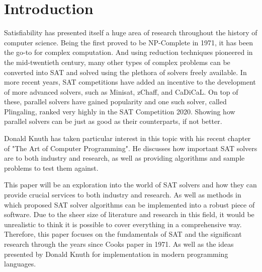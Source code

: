 \documentclass{article}
\begin{document}


\newpage
\thispagestyle{empty}
\tableofcontents

\newpage
\section{Introduction}
Satisfiability has presented itself a huge area of research throughout the history of computer
science. Being the first proved to be NP-Complete in 1971\cite{scook}, it has been the go-to for complex
computation. And using reduction techniques pioneered in the mid-twentieth century, many other types
of complex problems can be converted into SAT and solved using the plethora of solvers freely
available. In more recent years, SAT competitions have added an incentive to the development of more
advanced solvers, such as Minisat, zChaff, and CaDiCaL. On top of these, parallel solvers have
gained popularity and one such solver, called Plingaling, ranked very highly in the SAT Competition
2020. Showing how parallel solvers can be just as good as their counterparts, if not better.

Donald Knuth has taken particular interest in this topic with his recent chapter of "The Art of Computer Programming". He 
discusses how important SAT solvers are to both industry and research, as well as providing algorithms and sample problems to 
test them against.

This paper will be an exploration into the world of SAT solvers and how they can provide crucial services to both industry and 
research. As well as methods in which proposed SAT solver algorithms can be implemented into a robust piece of software. Due to 
the sheer size of literature and research in this field, it would be unrealistic to think it is possible to cover everything in a 
comprehensive way. Therefore, this paper focuses on the fundamentals of SAT and the significant research through the years since 
Cooks paper in 1971\cite{scook}. As well as the ideas presented by Donald Knuth for implementation in modern programming 
languages.
\end{document}
